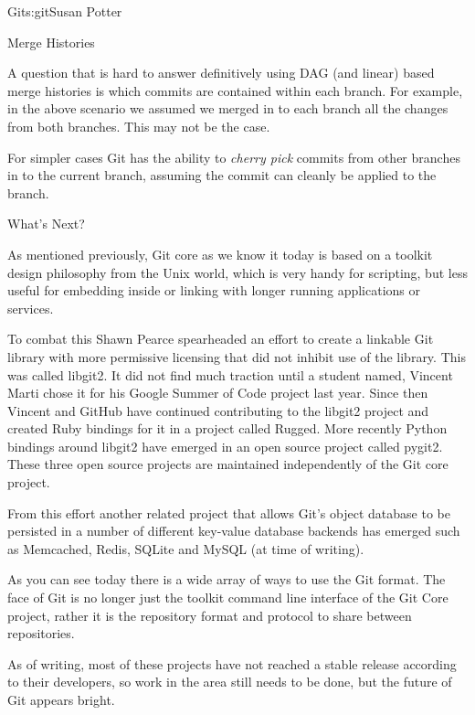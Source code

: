 \begin{aosachapter}{Git}{s:git}{Susan Potter}
\begin{aosasect1}{Merge Histories}

A question that is hard to answer definitively using DAG (and linear) based
merge histories is which commits are contained within each branch. For
example, in the above scenario we assumed we merged in to each branch all
the changes from both branches. This may not be the case.

For simpler cases Git has the ability to \emph{cherry pick} commits from
other branches in to the current branch, assuming the commit can cleanly
be applied to the branch.

\end{aosasect1}

\begin{aosasect1}{What's Next?}

As mentioned previously, Git core as we know it today is based on a toolkit
design philosophy from the Unix world, which is very handy for scripting,
but less useful for embedding inside or linking with longer running
applications or services.

To combat this Shawn Pearce spearheaded an effort to create a linkable Git
library with more permissive licensing that did not inhibit use of the
library. This was called libgit2. It did not find much traction until a
student named, Vincent Marti chose it for his Google Summer of Code project
last year. Since then Vincent and GitHub have continued contributing to the
libgit2 project and created Ruby bindings for it in a project called Rugged.
More recently Python bindings around libgit2 have emerged in an open source
project called pygit2. These three open source projects are maintained
independently of the Git core project.

From this effort another related project that allows Git's object database
to be persisted in a number of different key-value database backends has
emerged such as Memcached, Redis, SQLite and MySQL (at time of writing).

As you can see today there is a wide array of ways to use the Git format.
The face of Git is no longer just the toolkit command line interface of
the Git Core project, rather it is the repository format and protocol to
share between repositories.

As of writing, most of these projects have not reached a stable release
according to their developers, so work in the area still needs to be done,
but the future of Git appears bright.


\end{aosasect1}
\end{aosachapter}
